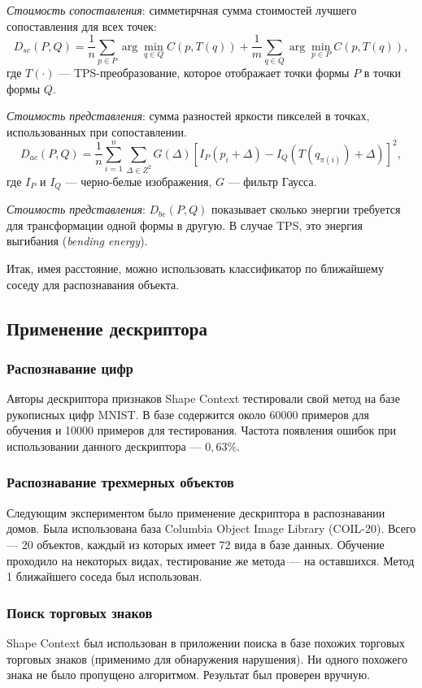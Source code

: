\emph{Стоимость сопоставления}: симметирчная сумма стоимостей лучшего сопоставления для всех точек:
\begin{displaymath}
  D_{sc}(P,Q) = \frac{1}{n}\sum_{p \in P} \arg \underset{q \in Q}{\min} C(p,T(q)) + \frac{1}{m}\sum_{q \in Q} \arg \underset{p \in P}{\min} C(p,T(q)),
\end{displaymath}
где $T(\cdot)$ --- TPS-преобразование, которое отображает точки формы $P$ в точки формы $Q$.

\emph{Стоимость представления}: сумма разностей яркости пикселей в точках, использованных при сопоставлении.
\begin{displaymath}
  D_{ac}(P,Q) = \frac{1}{n}\sum_{i=1}^n\sum_{\Delta \in Z^2} G(\Delta)\left [I_P(p_i + \Delta) - I_Q(T(q_{\pi(i)}) + \Delta)\right ]^2,
\end{displaymath}
где $I_P$ и $I_Q$ --- черно-белые изображения, $G$ --- фильтр Гаусса.

\emph{Стоимость представления}: $D_{be}(P,Q)$ показывает сколько энергии требуется для трансформации одной формы в другую. В случае TPS, это энергия выгибания (\emph{bending energy}).

Итак, имея расстояние, можно использовать классификатор по ближайшему соседу для распознавания объекта.

\subsection{Применение дескриптора}
\subsubsection{Распознавание цифр}
Авторы дескриптора признаков Shape Context тестировали свой метод на базе рукописных цифр MNIST. В базе содержится около 60000 примеров для обучения и 10000 примеров для тестирования. Частота появления ошибок при использовании данного дескриптора --- $0,63\%$.

\subsubsection{Распознавание трехмерных объектов}
Следующим экспериментом было применение дескриптора в распознавании домов. Была использована база Columbia Object Image Library (COIL-20). Всего --- 20 объектов, каждый из которых имеет 72 вида в базе данных. Обучение проходило на некоторых видах, тестирование же метода --- на оставшихся. Метод 1 ближайшего соседа был использован.

\subsubsection{Поиск торговых знаков}
Shape Context был использован в приложении поиска в базе похожих торговых торговых знаков (применимо для обнаружения нарушения). Ни одного похожего знака не было пропущено алгоритмом. Результат был проверен вручную.

\newpage
